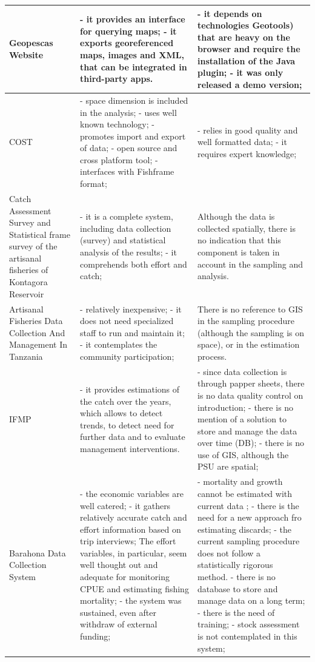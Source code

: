 \documentclass[11pt]{article} %
\begin{document}
\begin{center}
\begin{supertabular}{ | p{0.3\textwidth} | p{0.3\textwidth} | p{0.3\textwidth} |}
Geopescas Website & - it provides an interface for querying maps; - it exports georeferenced maps, images and XML, that can be integrated in third-party apps.  & - it depends on technologies Geotools) that are heavy on the browser and require the installation of the Java plugin; - it was only released a demo version; \\ \hline
COST & - space dimension is included in the analysis; - uses well known technology; - promotes import and export of data; - open source and cross platform tool; - interfaces with Fishframe format; & - relies in good quality and well formatted data; - it requires expert knowledge; \\ \hline
Catch Assessment Survey and Statistical frame survey of the artisanal fisheries of Kontagora Reservoir & - it is a complete system, including data collection (survey) and statistical analysis of the results; - it comprehends both effort and catch; & Although the data is collected spatially, there is no indication that this component is taken in account in the sampling and analysis. \\ \hline
Artisanal Fisheries Data Collection And Management In Tanzania & - relatively inexpensive; - it does not need specialized staff to run and maintain it; - it contemplates the community participation; & There is no reference to GIS in the sampling procedure (although the sampling is on space), or in the estimation process. \\ \hline
IFMP & - it provides estimations of the catch over the years, which allows to detect trends, to detect need for further data and to evaluate management interventions. & - since data collection is through papper sheets, there is no data quality control on introduction; - there is no mention of a solution to store and manage the data over time (DB); - there is no use of GIS, although the PSU are spatial; \\ \hline
Barahona Data Collection System & - the economic variables are well catered; - it gathers relatively accurate catch and effort information based on trip interviews; The effort variables, in particular, seem well thought out and adequate for monitoring CPUE and estimating fishing mortality; - the system was sustained, even after withdraw of external funding; & - mortality and growth cannot be estimated with current data ; - there is the need for a new approach fro estimating discards; - the current sampling procedure does not follow a statistically rigorous method. - there is no database to store and manage data on a long term; - there is the need of training; - stock assessment is not contemplated in this system; \\ \hline

\end{supertabular}
\end{center}
\end{document}
